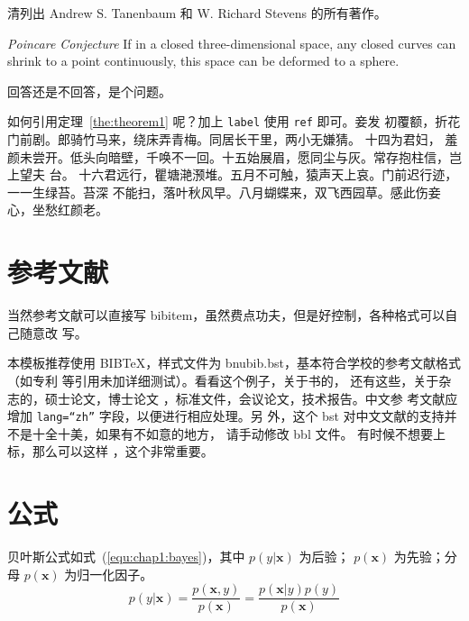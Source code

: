 \begin{exercise}
  清列出 Andrew S. Tanenbaum 和 W. Richard Stevens 的所有著作。
\end{exercise}

\begin{conjecture} \textit{Poincare Conjecture} If in a closed three-dimensional
  space, any closed curves can shrink to a point continuously, this space can be
  deformed to a sphere.
\end{conjecture}

\begin{problem}
 回答还是不回答，是个问题。 
\end{problem}

如何引用定理~\ref{the:theorem1} 呢？加上 \verb|label| 使用 \verb|ref| 即可。妾发
初覆额，折花门前剧。郎骑竹马来，绕床弄青梅。同居长干里，两小无嫌猜。 十四为君妇，
羞颜未尝开。低头向暗壁，千唤不一回。十五始展眉，愿同尘与灰。常存抱柱信，岂上望夫
台。 十六君远行，瞿塘滟滪堆。五月不可触，猿声天上哀。门前迟行迹，一一生绿苔。苔深
不能扫，落叶秋风早。八月蝴蝶来，双飞西园草。感此伤妾心，坐愁红颜老。

\section{参考文献}
\label{sec:bib}
当然参考文献可以直接写 bibitem，虽然费点功夫，但是好控制，各种格式可以自己随意改
写。

本模板推荐使用 BIB\TeX，样式文件为 bnubib.bst，基本符合学校的参考文献格式（如专利
等引用未加详细测试）。看看这个例子，关于书的\cite{tex, companion, ColdSources}，
还有这些\cite{Krasnogor2004e, clzs, zjsw}，关于杂志的\cite{ELIDRISSI94,
  MELLINGER96, SHELL02}，硕士论文\cite{zhubajie, metamori2004}，博士论文
\cite{shaheshang, FistSystem01}，标准文件\cite{IEEE-1363}，会议论文\cite{DPMG,kocher99}，技术报告\cite{NPB2}。中文参
考文献\cite{cnarticle}应增加 \texttt{lang=``zh''} 字段，以便进行相应处理。另
外，这个 bst 对中文文献\cite{cnproceed}的支持并不是十全十美，如果有不如意的地方，
请手动修改 bbl 文件。
有时候不想要上标，那么可以这样 ，这个非常重要。

\section{公式}
\label{sec:equation}
贝叶斯公式如式~(\ref{equ:chap1:bayes})，其中 $p(y|\mathbf{x})$ 为后验；
$p(\mathbf{x})$ 为先验；分母 $p(\mathbf{x})$ 为归一化因子。
\begin{equation}
\label{equ:chap1:bayes}
p(y|\mathbf{x}) = \frac{p(\mathbf{x},y)}{p(\mathbf{x})}=
\frac{p(\mathbf{x}|y)p(y)}{p(\mathbf{x})} 
\end{equation}

